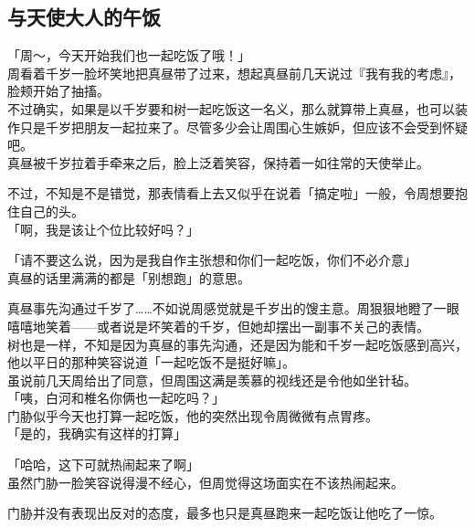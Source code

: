 \subsection{与天使大人的午饭}

「周～，今天开始我们也一起吃饭了哦！」\\

周看着千岁一脸坏笑地把真昼带了过来，想起真昼前几天说过『我有我的考虑』，脸颊开始了抽搐。\\

不过确实，如果是以千岁要和树一起吃饭这一名义，那么就算带上真昼，也可以装作只是千岁把朋友一起拉来了。尽管多少会让周围心生嫉妒，但应该不会受到怀疑吧。\\

真昼被千岁拉着手牵来之后，脸上泛着笑容，保持着一如往常的天使举止。

不过，不知是不是错觉，那表情看上去又似乎在说着「搞定啦」一般，令周想要抱住自己的头。\\

「啊，我是该让个位比较好吗？」

「请不要这么说，因为是我自作主张想和你们一起吃饭，你们不必介意」\\%

真昼的话里满满的都是「别想跑」的意思。

真昼事先沟通过千岁了……不如说周感觉就是千岁出的馊主意。周狠狠地瞪了一眼嘻嘻地笑着——或者说是坏笑着的千岁，但她却摆出一副事不关己的表情。\\

树也是一样，不知是因为真昼的事先沟通，还是因为能和千岁一起吃饭感到高兴，他以平日的那种笑容说道「一起吃饭不是挺好嘛」。\\

虽说前几天周给出了同意，但周围这满是羡慕的视线还是令他如坐针毡。\\

「咦，白河和椎名你俩也一起吃吗？」\\

门胁似乎今天也打算一起吃饭，他的突然出现令周微微有点胃疼。\\

「是的，我确实有这样的打算」

「哈哈，这下可就热闹起来了啊」\\

虽然门胁一脸笑容说得漫不经心，但周觉得这场面实在不该热闹起来。%

门胁并没有表现出反对的态度，最多也只是真昼跑来一起吃饭让他吃了一惊。\\


